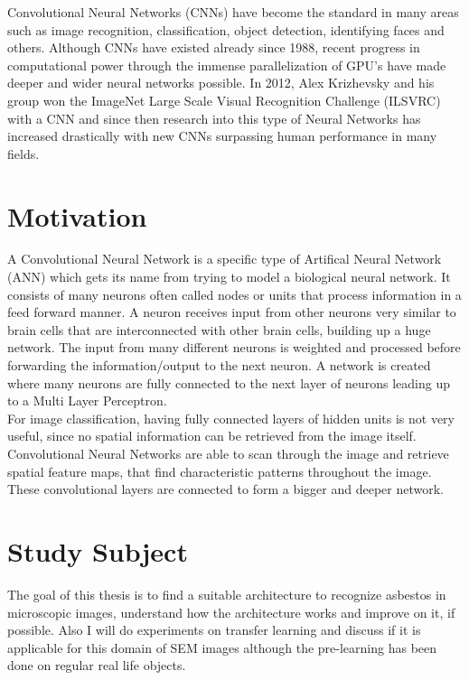 Convolutional Neural Networks (CNNs) have become the standard in many areas such as image recognition, classification, object detection, identifying faces and others. Although CNNs have existed already since 1988, recent progress in computational power through the immense parallelization of GPU's have made deeper and wider neural networks possible. In 2012, Alex Krizhevsky and his group won the ImageNet Large Scale Visual Recognition Challenge (ILSVRC)~\cite{krizhevsky2012imagenet, imagenet} with a CNN and since then research into this type of Neural Networks has increased drastically with new CNNs surpassing human performance in many fields. \\

\section{Motivation}

A Convolutional Neural Network is a specific type of Artifical Neural Network (ANN) which gets its name from trying to model a biological neural network. It consists of many neurons often called nodes or units that process information in a feed forward manner. A neuron receives input from other neurons very similar to brain cells that are interconnected with other brain cells, building up a huge network. The input from many different neurons is weighted and processed before forwarding the information/output to the next neuron. A network is created where many neurons are fully connected to the next layer of neurons leading up to a Multi Layer Perceptron. \\

For image classification, having fully connected layers of hidden units is not very useful, since no spatial information can be retrieved from the image itself. Convolutional Neural Networks are able to scan through the image and retrieve spatial feature maps, that find characteristic patterns throughout the image. These convolutional layers are connected to form a bigger and deeper network.  \\

\section{Study Subject}

The goal of this thesis is to find a suitable architecture to recognize asbestos in microscopic images, understand how the architecture works and improve on it, if possible. Also I will do experiments on transfer learning and discuss if it is applicable for this domain of SEM images although the pre-learning has been done on regular real life objects. \\

